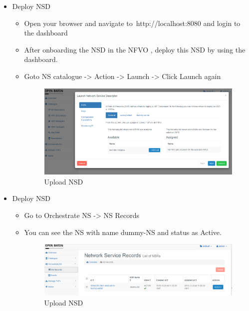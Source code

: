 \begin{itemize}
				\item Deploy NSD
				\begin{itemize}
					\item Open your browser and navigate to http://localhost:8080 and login to the dashboard
					\item After onboarding the NSD in the NFVO , deploy this NSD by using the dashboard.
					\item Goto NS catalogue -> Action -> Launch -> Click Launch again
					\begin{figure} [h]
						\centering
						\includegraphics[width=0.7\linewidth]{figures/launchNSD}
						\caption{Upload NSD}
						\label{fig:launchNSD}
					\end{figure}
				\end{itemize}
			
				\item Deploy NSD
				\begin{itemize}
					\item Go to Orchestrate NS -> NS Records
					\item You can see the NS with name dummy-NS and status as Active.
					\begin{figure} [h]
						\centering
						\includegraphics[width=0.7\linewidth]{figures/NSDRecord}
						\caption{Upload NSD}
						\label{fig:NSDRecord}
					\end{figure}
				\end{itemize}
			\end{itemize}
